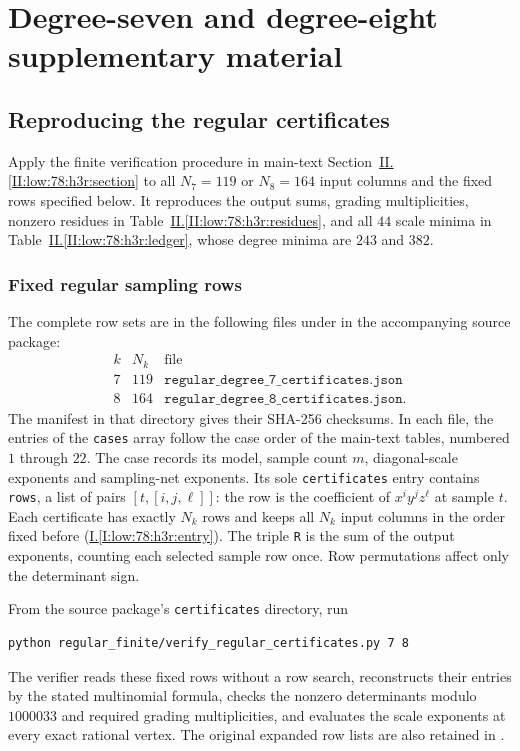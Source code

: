 \documentclass[11pt]{amsart}
\theoremstyle{definition}
\theoremstyle{remark}
\numberwithin{equation}{section}
\newcommand{\partIref}[1]{\hyperref[I:#1]{I.\ref*{I:#1}}}
\newcommand{\partIeqref}[1]{\textup{(\partIref{#1})}}
\newcommand{\partIIref}[1]{\hyperref[II:#1]{II.\ref*{II:#1}}}
\begin{document}
\section{Degree-seven and degree-eight supplementary material}


\label{supp:seven-eight}

\subsection{Reproducing the regular certificates}\label{supp:seven-eight:verification}

Apply the finite verification procedure in main-text Section~\partIIref{low:78:h3r:section} to all $N_7=119$ or $N_8=164$ input columns and the fixed rows specified below. It reproduces the output sums, grading multiplicities, nonzero residues in Table~\partIIref{low:78:h3r:residues}, and all $44$ scale minima in Table~\partIIref{low:78:h3r:ledger}, whose degree minima are $243$ and $382$.

\subsubsection{Fixed regular sampling rows}\label{low:78:h3r:row-appendix}

The complete row sets are in the following files under  in the accompanying source package:
\[
\begin{array}{ccl}
k&N_k&\text{file}\\
7&119&\texttt{regular\_degree\_7\_certificates.json}\\
8&164&\texttt{regular\_degree\_8\_certificates.json}.
\end{array}
\]
The manifest  in that directory gives their SHA-256 checksums. In each file, the entries of the \texttt{cases} array follow the case order of the main-text tables, numbered $1$ through $22$. The case records its model, sample count $m$, diagonal-scale exponents and sampling-net exponents. Its sole \texttt{certificates} entry contains \texttt{rows}, a list of pairs $[t,[i,j,\ell]]$: the row is the coefficient of $x^iy^jz^\ell$ at sample $t$. Each certificate has exactly $N_k$ rows and keeps all $N_k$ input columns in the order fixed before \partIeqref{low:78:h3r:entry}. The triple \texttt{R} is the sum of the output exponents, counting each selected sample row once. Row permutations affect only the determinant sign.

From the source package's \texttt{certificates} directory, run
\begin{verbatim}
python regular_finite/verify_regular_certificates.py 7 8
\end{verbatim}
The verifier reads these fixed rows without a row search, reconstructs their entries by the stated multinomial formula, checks the nonzero determinants modulo $1000033$ and required grading multiplicities, and evaluates the scale exponents at every exact rational vertex. The original expanded row lists are also retained in .
\end{document}
